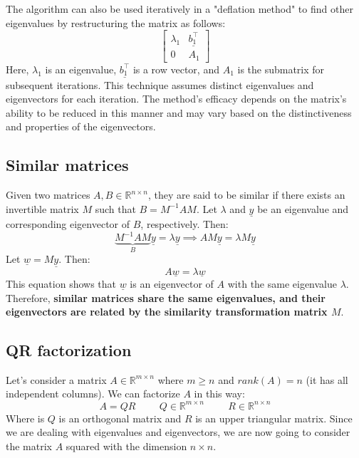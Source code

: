 The algorithm can also be used iteratively in a "deflation method" to find other eigenvalues by restructuring the matrix as follows:
\[
\begin{bmatrix}
    \lambda_1 & \underline{b_1^\top} \\
    0 & A_1
\end{bmatrix}
\]
Here, \(\lambda_1\) is an eigenvalue, \(\underline{b_1^\top}\) is a row vector, and \(A_1\) is the submatrix for subsequent iterations. This technique assumes distinct eigenvalues and eigenvectors for each iteration. The method's efficacy depends on the matrix's ability to be reduced in this manner and may vary based on the distinctiveness and properties of the eigenvectors.


\subsection*{Similar matrices}
Given two matrices $A, B \in \mathbb{R}^{n \times n}$, they are said to be similar if there exists an invertible matrix $M$ such that $B = M^{-1}AM$. Let $\lambda$ and $\underline{y}$ be an eigenvalue and corresponding eigenvector of $B$, respectively. Then:
\[
    \underbrace{M^{-1}AM}_{B}\underline{y} = \lambda \underline{y} \implies AM\underline{y} = \lambda M\underline{y}
\]
Let $\underline{w} = M\underline{y}$. Then:
\[
    A\underline{w} = \lambda \underline{w}
\]
This equation shows that $\underline{w}$ is an eigenvector of $A$ with the same eigenvalue $\lambda$. Therefore, \textbf{similar matrices share the same eigenvalues, and their eigenvectors are related by the similarity transformation matrix $M$}.

\subsection*{QR factorization}
 Let's consider a matrix $A \in \mathbb{R}^{m\times n}$ where $m \geq n$ and $rank(A) = n$ (it has all independent columns). We can factorize $A$ in this way:
\[
    A = QR \hspace{1cm} Q \in \mathbb{R}^{m\times n} \hspace{1cm} R \in \mathbb{R}^{n\times n}
\]
Where is $Q$ is an orthogonal matrix and $R$ is an upper triangular matrix. Since we are dealing with eigenvalues and eigenvectors, we are now going to consider the matrix $A$ squared with the dimension $n\times n$.

